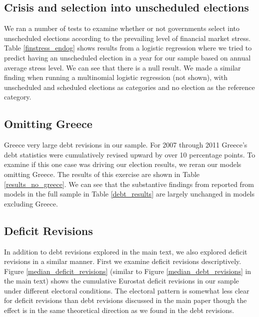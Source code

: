 \documentclass[]{article}
\begin{document}


\subsection*{Crisis and selection into unscheduled elections}

We ran a number of tests to examine whether or not governments select into unscheduled elections according to the prevailing level of financial market stress. Table \ref{finstress_endog} shows results from a logistic regression where we tried to predict having an unscheduled election in a year for our sample based on annual average stress level. We can see that there is a null result. We made a similar finding when running a multinomial logistic regression (not shown), with unscheduled and scheduled elections as categories and no election as the reference category.



\subsection*{Omitting Greece}

Greece very large debt revisions in our sample. For 2007 through 2011 Greece's debt statistics were cumulatively revised upward by over 10 percentage points. To examine if this one case was driving our election results, we reran our models omitting Greece. The results of this exercise are shown in Table \ref{results_no_greece}. We can see that the substantive findings from reported from models in the full sample in Table \ref{debt_results} are largely unchanged in models excluding Greece.

\begin{landscape}
    
\end{landscape}

\subsection*{Deficit Revisions}

In addition to debt revisions explored in the main text, we also explored deficit revisions in a similar manner. First we examine deficit revisions descriptively. Figure \ref{median_deficit_revisions} (similar to Figure \ref{median_debt_revisions} in the main text) shows the cumulative Eurostat deficit revisions in our sample under different electoral conditions. The electoral pattern is somewhat less clear for deficit revisions than debt revisions discussed in the main paper though the effect is in the same theoretical direction as we found in the debt revisions.
\end{document}
